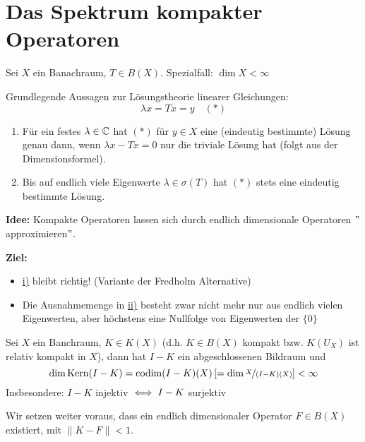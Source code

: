 
\section{Das Spektrum kompakter Operatoren}



Sei $X$ ein Banachraum, $T \in B(X)$. Spezialfall: $\dim X < \infty$

Grundlegende Aussagen zur Lösungstheorie linearer Gleichungen:
	\[ \lambda x = T x = y \quad (*) \label{eq:14.0-linereGleichung} \]
\begin{enumerate}[label=\roman*\upshape)] 
	\label{item:14.0i}
	\item Für ein festes $\lambda \in \mathbb{C}$ hat \hyperref[eq:14.0-linereGleichung]{$(*)$} für $y \in X$ eine (eindeutig bestimmte) Lösung genau dann, wenn $\lambda x - T x = 0$ nur die triviale Lösung hat (folgt aus der Dimensionsformel).
	\label{item:14.0ii}
	\item Bis auf endlich viele Eigenwerte $\lambda \in \sigma(T)$ hat \hyperref[eq:14.0-linereGleichung]{$(*)$} stets eine eindeutig bestimmte Lösung.
\end{enumerate}

\textbf{Idee:} Kompakte Operatoren lassen sich durch endlich dimensionale Operatoren $"$approximieren$"$.

\textbf{Ziel:}
\begin{itemize}
	\item \hyperref[item:14.0i]{i)} bleibt richtig! (Variante der Fredholm Alternative)
	\item Die Ausnahmemenge in \hyperref[item:14.0ii]{ii)} besteht zwar nicht mehr nur aus endlich vielen Eigenwerten, aber höchstens eine Nullfolge von Eigenwerten der $\{ 0 \}$
\end{itemize}

\begin{satz} \label{satz:14.1}
	Sei $X$ ein Banchraum, $K \in K(X)$ (d.h. $K \in B(X)$ kompakt bzw. $K(U_{X})$ ist relativ kompakt in $X$), dann hat $I - K$ ein abgeschlossenen Bildraum und 
		\[ \dim \mathop{\rm Kern}\nolimits(I  - K) = \operatorname{codim}(I - K)(X) \left[ = \dim \nicefrac{ X }{ (I - K)(X) }  \right] < \infty \]
		Insbesondere: $I - K$ injektiv $\iff I - K$ surjektiv
\end{satz}

\begin{beweis}
	Wir setzen weiter voraus, dass ein endlich dimensionaler Operator $F \in B(X)$ existiert, mit $\| K - F \| < 1$.
\end{beweis}

